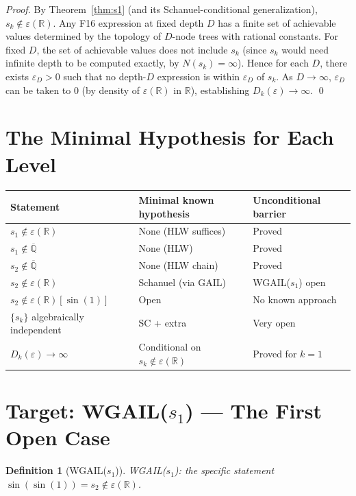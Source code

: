 \documentclass[11pt]{article}
\newtheorem{definition}[theorem]{Definition}
\begin{document}
\begin{proof}
By Theorem~\ref{thm:s1} (and its Schanuel-conditional generalization),
$s_k \notin \varepsilon(\mathbb{R})$.
Any F16 expression at fixed depth $D$ has a finite set of achievable values
determined by the topology of $D$-node trees with rational constants.
For fixed $D$, the set of achievable values does not include $s_k$ (since $s_k$ would
need infinite depth to be computed exactly, by $N(s_k) = \infty$).
Hence for each $D$, there exists $\varepsilon_D > 0$ such that no depth-$D$ expression
is within $\varepsilon_D$ of $s_k$. As $D \to \infty$, $\varepsilon_D$ can be taken
to 0 (by density of $\varepsilon(\mathbb{R})$ in $\mathbb{R}$), establishing $D_k(\varepsilon) \to \infty$. \qed
\end{proof}

\section{The Minimal Hypothesis for Each Level}

\begin{center}
\renewcommand{\arraystretch}{1.3}
\begin{tabular}{lll}
\toprule
Statement & Minimal known hypothesis & Unconditional barrier \\
\midrule
$s_1 \notin \varepsilon(\mathbb{R})$ & None (HLW suffices) & Proved \\
$s_1 \notin \overline{\mathbb{Q}}$ & None (HLW) & Proved \\
$s_2 \notin \overline{\mathbb{Q}}$ & None (HLW chain) & Proved \\
$s_2 \notin \varepsilon(\mathbb{R})$ & Schanuel (via GAIL) & WGAIL($s_1$) open \\
$s_2 \notin \varepsilon(\mathbb{R})[\sin(1)]$ & Open & No known approach \\
$\{s_k\}$ algebraically independent & SC + extra & Very open \\
$D_k(\varepsilon) \to \infty$ & Conditional on $s_k \notin \varepsilon(\mathbb{R})$ & Proved for $k=1$ \\
\bottomrule
\end{tabular}
\end{center}

\section{Target: WGAIL($s_1$) — The First Open Case}

\begin{definition}[WGAIL($s_1$)]
WGAIL($s_1$): the specific statement $\sin(\sin(1)) = s_2 \notin \varepsilon(\mathbb{R})$.
\end{definition}
\end{document}
